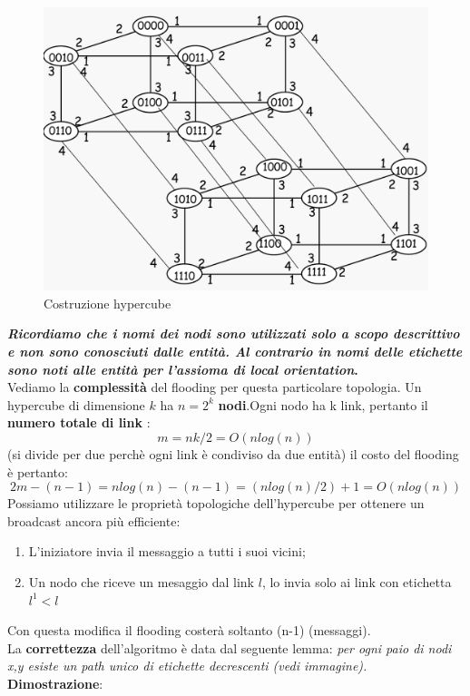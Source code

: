 \documentclass[12pt]{article}
\begin{document}
			\begin{figure}[h!]
				\centering
				\includegraphics[scale=0.20]{img/hyper2.png}
				\caption{Costruzione hypercube}
			\end{figure}
			\textbf{\textit{Ricordiamo che i nomi dei nodi sono utilizzati solo a scopo descrittivo e non sono conosciuti dalle entità. Al contrario in nomi delle etichette sono noti alle entità per l'assioma di local orientation}.}\\
			Vediamo la \textbf{complessità} del flooding per questa particolare topologia. Un hypercube di dimensione $k$ ha $n=2^{k}$ \textbf{nodi}.Ogni nodo ha k link, pertanto il \textbf{numero totale di link }:
			$$m=nk/2= O(nlog(n)) $$ (si divide per due perchè ogni link è condiviso da due entità) il costo del flooding è pertanto:
			$$2m-(n-1) = nlog(n)-(n-1)=(nlog(n)/2) +1=O(nlog(n))$$
			Possiamo utilizzare le proprietà topologiche dell'hypercube per ottenere un broadcast ancora più efficiente:
			\begin{enumerate}
				\item L'iniziatore invia il messaggio a tutti i suoi vicini;
				\item Un nodo che riceve un mesaggio dal link $l$, lo invia solo ai link con etichetta $l^{1}<l$ 
			\end{enumerate}
			Con questa modifica il flooding costerà soltanto (n-1) (messaggi).\\
			La \textbf{correttezza} dell'algoritmo è data dal seguente lemma: \textit{per ogni paio di nodi x,y esiste un path unico di etichette decrescenti (vedi immagine).}\\
			\textbf{Dimostrazione}:
\end{document}
